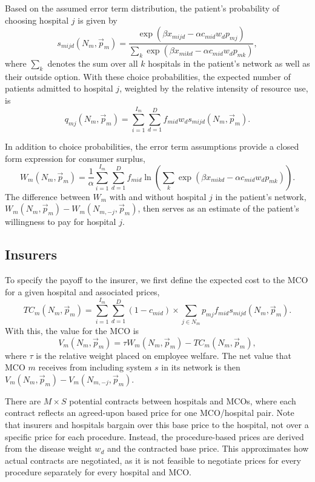 \documentclass[
  letterpaper,
  DIV=11,
  numbers=noendperiod]{scrreport}
\theoremstyle{definition}
\theoremstyle{remark}
\begin{document}
Based on the assumed error term distribution, the patient's probability
of choosing hospital \(j\) is given by
\[s_{mijd}(N_{m},\vec{p}_{m}) = \frac{\exp (\beta x_{mijd} - \alpha c_{mid} w_{d} p_{mj})}{\sum_{k}\exp (\beta x_{mikd} - \alpha c_{mid} w_{d} p_{mk})},\]
where \(\sum_{k}\) denotes the sum over all \(k\) hospitals in the
patient's network as well as their outside option. With these choice
probabilities, the expected number of patients admitted to hospital
\(j\), weighted by the relative intensity of resource use, is
\[q_{mj}(N_{m},\vec{p}_{m}) = \sum_{i=1}^{I_{m}} \sum_{d=1}^{D} f_{mid} w_{d} s_{mijd}(N_{m},\vec{p}_{m}).\]

In addition to choice probabilities, the error term assumptions provide
a closed form expression for consumer surplus,
\[W_{m}(N_{m},\vec{p}_{m})=\frac{1}{\alpha} \sum_{i=1}^{I_{m}} \sum_{d=1}^{D} f_{mid} \ln \left( \sum_{k}\exp (\beta x_{mikd} - \alpha c_{mid} w_{d} p_{mk}) \right).\]
The difference between \(W_{m}\) with and without hospital \(j\) in the
patient's network,
\(W_{m}(N_{m},\vec{p}_{m}) - W_{m}(N_{m,-j},\vec{p}_{m})\), then serves
as an estimate of the patient's willingness to pay for hospital \(j\).

\hypertarget{insurers}{%
\subsection{Insurers}\label{insurers}}

To specify the payoff to the insurer, we first define the expected cost
to the MCO for a given hospital and associated prices,
\[TC_{m}(N_{m},\vec{p}_{m})=\sum_{i=1}^{I_{m}} \sum_{d=1}^{D} (1 - c_{mid}) \times \sum_{j\in N_{m}} p_{mj} f_{mid} s_{mijd}(N_{m},\vec{p}_{m}).\]
With this, the value for the MCO is
\[V_{m}(N_{m},\vec{p}_{m}) = \tau W_{m}(N_{m},\vec{p}_{m}) - TC_{m}(N_{m},\vec{p}_{m}),\]
where \(\tau\) is the relative weight placed on employee welfare. The
net value that MCO \(m\) receives from including system \(s\) in its
network is then
\(V_{m}(N_{m},\vec{p}_{m})-V_{m}(N_{m,-j},\vec{p}_{m})\).

There are \(M \times S\) potential contracts between hospitals and MCOs,
where each contract reflects an agreed-upon based price for one
MCO/hospital pair. Note that insurers and hospitals bargain over this
base price to the hospital, not over a specific price for each
procedure. Instead, the procedure-based prices are derived from the
disease weight \(w_{d}\) and the contracted base price. This
approximates how actual contracts are negotiated, as it is not feasible
to negotiate prices for every procedure separately for every hospital
and MCO.
\end{document}
